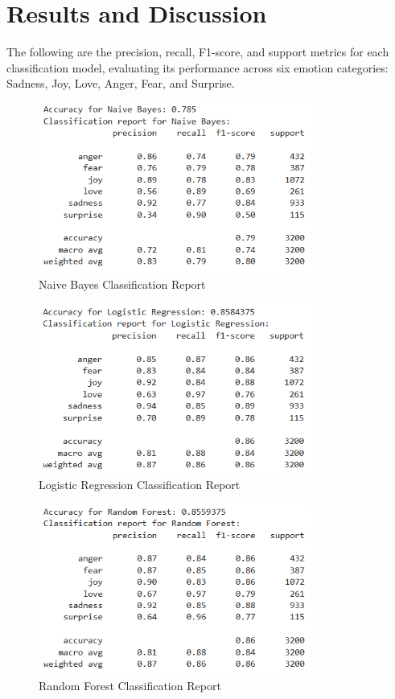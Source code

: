 \section{Results and Discussion}
The following are the precision, recall, F1-score, and support metrics for each classification model, evaluating its performance across six emotion categories: Sadness, Joy, Love, Anger, Fear, and Surprise.

\begin{figure}[h!]
\centering
\includegraphics[width=0.8\textwidth]{naive_bayes_result.png}
\caption{Naive Bayes Classification Report}
\label{fig:naive_bayes}
\end{figure}

\begin{figure}[h!]
\centering
\includegraphics[width=0.8\textwidth]{logistic_regression_result.png}
\caption{Logistic Regression Classification Report}
\label{fig:logistic_regression}
\end{figure}

\begin{figure}[h!]
\centering
\includegraphics[width=0.8\textwidth]{random_forest_result.png}
\caption{Random Forest Classification Report}
\label{fig:random_forest}
\end{figure}

